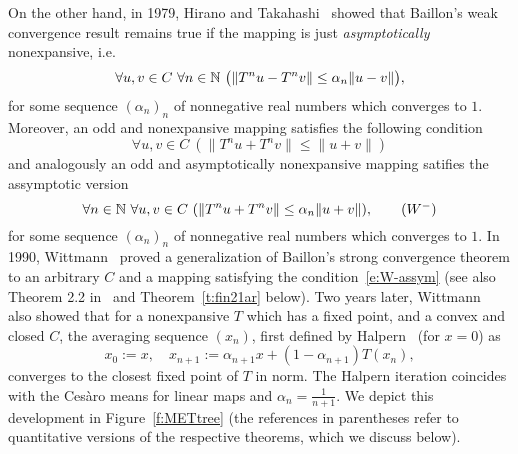 On the other hand, in 1979, Hirano and Takahashi~\cite{Hirano1979} showed that Baillon's weak convergence result remains true if the mapping is just {\em asymptotically} nonexpansive, i.e. 
\[
\forall u,v\in C\ \forall n\in\mathbb{N}\ \big( \|T^nu-T^nv\|\leq \alpha_n\|u-v\|\big),
\]
for some sequence $(\alpha_n)_n$ of nonnegative real numbers which converges to $1$. 
Moreover, an odd and nonexpansive
mapping satisfies the following condition
\[
\forall u,v\in C\ (\| T^nu + T^nv \| \leq \|u + v\|) \tag{$W$}\label{e:W-intro}
\]
and analogously an odd and asymptotically nonexpansive mapping satifies the assymptotic version
\[
\forall n\in\NN\ \forall u,v\in C\ (\| T^nu + T^nv \| \leq \alpha_n\|u + v\|), \tag{$W^-$}\label{e:W-assym}
\]
for some sequence $(\alpha_n)_n$ of nonnegative real numbers which converges to $1$. In 1990, Wittmann~\cite{Wittmann90}
proved a generalization of Baillon's strong convergence theorem 
to an arbitrary $C$ and a mapping satisfying the condition~\eqref{e:W-assym} (see also Theorem 2.2 in~\cite{Wittmann90} and Theorem~\ref{t:fin21ar} below).
Two years later, Wittmann~\cite{Wittmann1992} also showed that for a nonexpansive $T$ which has a fixed point, and a convex and closed $C$, the averaging sequence $(x_n)$, first defined by Halpern~\cite{Halpern1967} (for $x=0$) as
\[
x_0:=x,\quad x_{n+1}:=\alpha_{n+1}x+(1-\alpha_{n+1})T(x_n),
\] converges to the closest fixed point of $T$ in norm. The Halpern iteration coincides
with the Ces{\`a}ro means for linear maps and $\alpha_n=\frac{1}{n+1}$.
We depict this development in Figure~\ref{f:METtree} (the references in parentheses refer to
quantitative versions of the respective theorems, which we discuss below).
